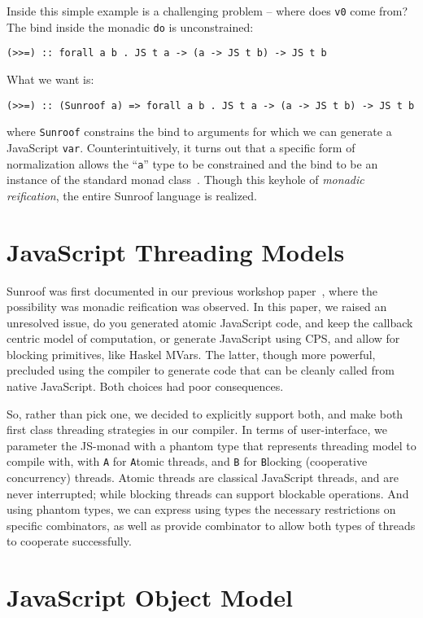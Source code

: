 \documentclass{llncs}
\begin{document}
Inside this simple example is a challenging problem -- where does
\verb|v0| come from? The bind inside the monadic \verb|do| is
unconstrained:
\begin{verbatim}
(>>=) :: forall a b . JS t a -> (a -> JS t b) -> JS t b
\end{verbatim}
\noindent  What we want is:
\begin{verbatim}
(>>=) :: (Sunroof a) => forall a b . JS t a -> (a -> JS t b) -> JS t b
\end{verbatim}
\noindent where \verb|Sunroof| constrains the bind to
arguments for which we can generate a JavaScript \verb|var|.
Counterintuitively, 
it turns out that a specific form of normalization allows 
the ``\verb|a|'' type to be constrained and the bind to 
be an instance of the standard monad class~\cite{..}.
Though this keyhole of {\em monadic reification\/},
the entire Sunroof language is realized.

\section{JavaScript Threading Models}

Sunroof was first documented in our previous 
workshop paper~\cite{Farmer:12:WebDSLs},
where the possibility was monadic reification was observed.
In this paper, we raised an unresolved issue, do you
generated atomic JavaScript code, and keep the callback
centric model of computation, or generate JavaScript
using CPS, and allow for blocking primitives,
like Haskel MVars. The latter, though more powerful, 
precluded using the compiler to generate
code that can be cleanly called from native JavaScript.
Both choices had poor consequences.

So, rather than pick one, we decided to explicitly support both,
and make both first class threading strategies in our compiler.
In terms of user-interface, we parameter the JS-monad
with a phantom type that represents threading model
to compile with, with \verb|A| for {\tt A}tomic threads,
and \verb|B| for {\tt B}locking (cooperative concurrency) threads. 
Atomic threads are classical JavaScript threads, and
are never interrupted; while blocking threads can
support blockable operations. And using phantom
types, we can express using types the necessary
restrictions on specific combinators, as well
as provide combinator to allow both types of
threads to cooperate successfully.

\section{JavaScript Object Model}
\end{document}
